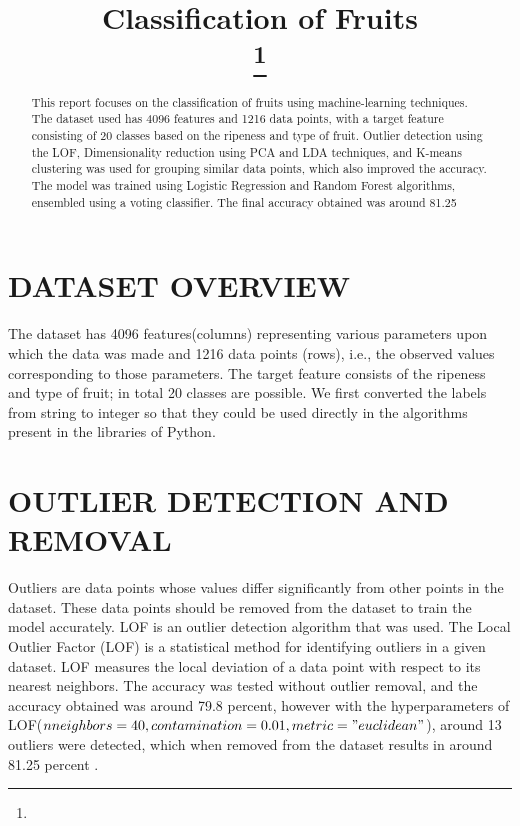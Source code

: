 \documentclass[conference]{IEEEtran}
\begin{document}
\title{ Classification of Fruits\\
{\footnotesize \textsuperscript{}}
\thanks{}
}

\author{
\and
{}

}

\maketitle

\begin{abstract}
This report focuses on the classification of fruits using machine-learning techniques. The dataset used has 4096 features and 1216 data points, with a target feature consisting of 20 classes based on the ripeness and type of fruit. Outlier detection using the LOF, Dimensionality reduction using PCA and LDA techniques, and K-means clustering was used for grouping similar data points, which also improved the accuracy. The model was trained using Logistic Regression and Random Forest algorithms, ensembled using a voting classifier. The final accuracy obtained was around 81.25%
\end{abstract}


\section{DATASET OVERVIEW }
The dataset has 4096 features(columns) representing various parameters upon which the data was made and 1216 data points (rows), i.e., the observed values corresponding to those parameters. The target feature consists of the ripeness and type of fruit; in total 20 classes are possible.
We first converted the labels from string to integer so that they could be used directly in the algorithms present in the libraries of Python.

\section{OUTLIER DETECTION AND REMOVAL }
Outliers are data points whose values differ significantly from other points in the dataset. These data points should be removed from the dataset to train the model accurately.
LOF is an outlier detection algorithm that was used. The Local Outlier Factor (LOF) is a statistical method for identifying outliers in a given dataset. LOF measures the local deviation of a data point with respect to its nearest neighbors.
The accuracy was tested without outlier removal, and the accuracy obtained was around 79.8 percent, however with the hyperparameters of LOF($n neighbors=40, contamination=0.01, metric = "euclidean"$), around 13 outliers were detected, which when removed from the dataset results in around 81.25 percent .
\end{document}
